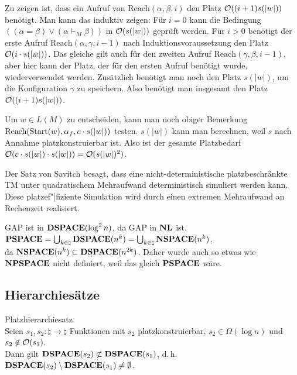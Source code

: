 \begin{Beweis}
    Zu zeigen ist, dass ein Aufruf von $\text{Reach}(\alpha, \beta, i)$ den Platz
    $\mathcal{O}((i + 1) s(|w|))$ benötigt.
    Man kann das induktiv zeigen:
    Für $i = 0$ kann die Bedingung
    $((\alpha = \beta) \lor (\alpha \vdash_M \beta))$ in $\mathcal{O}(s(|w|))$ geprüft werden.
    Für $i > 0$ benötigt der erste Aufruf $\text{Reach}(\alpha, \gamma, i - 1)$ nach
    Induktionsvoraussetzung den Platz $\mathcal{O}(i \cdot s(|w|))$.
    Das gleiche gilt auch für den zweiten Aufruf $\text{Reach}(\gamma, \beta, i - 1)$,
    aber hier kann der Platz, der für den ersten Aufruf benötigt wurde, wiederverwendet werden.
    Zusätzlich benötigt man noch den Platz $s(|w|)$, um die Konfiguration $\gamma$ zu speichern.
    Also benötigt man insgesamt den Platz $\mathcal{O}((i + 1) s(|w|))$.

    Um $w \in L(M)$ zu entscheiden, kann man noch obiger Bemerkung
    $\text{Reach}(\text{Start}(w), \alpha_f, c \cdot s(|w|))$ testen.
    $s(|w|)$ kann man berechnen, weil $s$ nach Annahme platzkonstruierbar ist.
    Also ist der gesamte Platzbedarf
    $\mathcal{O}(c \cdot s(|w|) \cdot s(|w|)) = \mathcal{O}(s(|w|)^2)$.
\end{Beweis}

\linie
\pagebreak

\begin{Bem}
    Der Satz von Savitch besagt, dass eine nicht-deterministische platzbeschränkte TM unter
    quadratischem Mehraufwand deterministisch simuliert werden kann.
    Diese platzef"|fiziente Simulation wird durch einen extremen Mehraufwand an Rechenzeit
    realisiert.
\end{Bem}

\begin{Kor}
    GAP ist in $\mathbf{DSPACE}(\log^2 n)$, da GAP in $\mathbf{NL}$ ist.\\
    $\mathbf{PSPACE} = \bigcup_{k \in \natural} \mathbf{DSPACE}(n^k) =
    \bigcup_{k \in \natural} \mathbf{NSPACE}(n^k)$,\\
    da $\mathbf{NSPACE}(n^k) \subset \mathbf{DSPACE}(n^{2k})$.
    Daher wurde auch so etwas wie $\mathbf{NPSPACE}$ nicht definiert, weil das gleich $\mathbf{PSPACE}$ wäre.
\end{Kor}

\subsection{%
    Hierarchiesätze%
}

\begin{Satz}{Platzhierarchiesatz}\\
    Seien $s_1, s_2\colon \natural \rightarrow \natural$ Funktionen mit
    $s_2$ platzkonstruierbar, $s_2 \in \Omega(\log n)$ und $s_2 \notin \mathcal{O}(s_1)$.\\
    Dann gilt $\mathbf{DSPACE}(s_2) \not\subset \mathbf{DSPACE}(s_1)$, d.\,h.
    $\mathbf{DSPACE}(s_2) \setminus \mathbf{DSPACE}(s_1) \not= \emptyset$.
\end{Satz}

